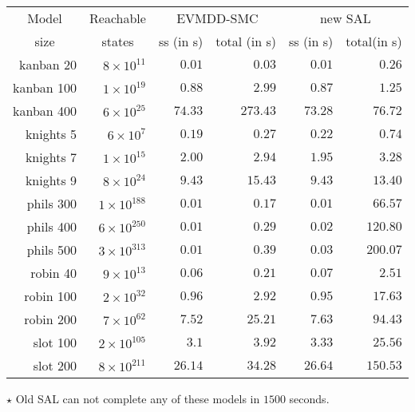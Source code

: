 
\begin{table}[htb]
\begin{center}
\small
\begin{tabular}{|r||r||r|r|r|r|}
\hline
\multicolumn{1}{|c||}{Model} & \multicolumn{1}{c||}{Reachable} & \multicolumn{2}{|c|}{EVMDD-SMC} & \multicolumn{2}{|c|}{new SAL} \\
\multicolumn{1}{|c||}{size}  & \multicolumn{1}{c||}{states} & ss (in s) & total (in s) & ss (in s) & total(in s) \\
\hline
kanban 20 	& $8 \times 10^{11}$  & $0.01$ & $0.03$ & $0.01$ & $0.26$ \\  
kanban 100 	& $1 \times 10^{19}$  & $0.88$ & $2.99$ & $0.87$ & $1.25$ \\  
kanban 400 	& $6 \times 10^{25}$  & $74.33$ & $273.43$ & $73.28$ & $76.72$ \\  
knights 5 	& $6 \times 10^{7}$   & $0.19$ & $0.27$ & $0.22$ & $0.74$ \\  
knights 7 	& $1 \times 10^{15}$  & $2.00$ & $2.94$ & $1.95$ & $3.28$ \\  
knights 9 	& $8 \times 10^{24}$  & $9.43$ & $15.43$ & $9.43$ & $13.40$ \\  
phils 300 	& $1 \times 10^{188}$  & $0.01$ & $0.17$ & $0.01$ & $66.57$ \\  
phils 400 	& $6 \times 10^{250}$  & $0.01$ & $0.29$ & $0.02$ & $120.80$ \\  
phils 500 	& $3 \times 10^{313}$  & $0.01$ & $0.39$ & $0.03$ & $200.07$ \\  
robin 40 	& $9 \times 10^{13}$  & $0.06$ & $0.21$ & $0.07$ & $2.51$ \\  
robin 100 	& $2 \times 10^{32}$  & $0.96$ & $2.92$ & $0.95$ & $17.63$ \\  
robin 200 	& $7 \times 10^{62}$  & $7.52$ & $25.21$ & $7.63$ & $94.43$ \\  
slot 100 	& $2 \times 10^{105}$  & $3.1$ & $3.92$ & $3.33$ & $25.56$ \\  
slot 200 	& $8 \times 10^{211}$  & $26.14$ & $34.28$ & $26.64$ & $150.53$ \\  
\hline
\end{tabular}
\end{center}
\end{table}

\begin{center}
{
\footnotesize
$\star$ Old SAL can not complete any of these models in $1500$ seconds.
}
\end{center}
